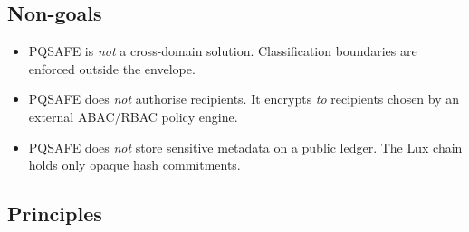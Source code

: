 \documentclass[11pt,a4paper]{article}
\begin{document}
\subsection{Non-goals}

\begin{itemize}[leftmargin=*,itemsep=0pt]
\item PQSAFE is \emph{not} a cross-domain solution. Classification
  boundaries are enforced outside the envelope.
\item PQSAFE does \emph{not} authorise recipients. It encrypts \emph{to}
  recipients chosen by an external ABAC/RBAC policy engine.
\item PQSAFE does \emph{not} store sensitive metadata on a public
  ledger. The Lux chain holds only opaque hash commitments.
\end{itemize}

\subsection{Principles}
\end{document}
